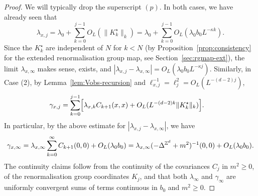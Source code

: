 \documentclass[11pt]{amsart}
\numberwithin{equation}{section}
\numberwithin{theorem}{section}
\newcommand{\1}{{\bf 1}}
\newcommand{\obs}{\star}
\newcommand{\Kobs}{K^\obs}
\newcommand{\ellxj}{\ell_{x,j}}
\newcommand{\OL}{O_L}
\begin{document}
\begin{proof}
  We will typically drop the superscript $(p)$.
  In both cases, we have already seen that
  \begin{equation}
    \lambda_{x,j}  = \lambda_0 + \sum_{k=0}^{j-1} \OL(\|\Kobs_k\|_k)  = \lambda_0 + \sum_{k=0}^{j-1} \OL(\lambda_0b_0L^{-\kappa k}) .
  \end{equation}
  Since the $\Kobs_k$ are independent of $N$ for $k<N$ (by
  Proposition~\ref{prop:consistency} for the extended
  renormalisation group map, see
    Section~\ref{sec:rgmap-ext}), the limit $\lambda_{x,\infty}$ makes sense, exists, and
    $|\lambda_{x,j}-\lambda_{x,\infty}| = \OL(\lambda_0b_0L^{-\kappa j})$.
  Similarly, in Case (2),
  by Lemma~\ref{lem:Vobs-recursion} and $\ellxj^{-1} = \ell_{j}^2 =\OL(L^{-(d-2)j})$,
  \begin{align}
    \gamma_{x,j}
    &= \sum_{k=0}^{j-1} \qB{ \lambda_{x,k} C_{k+1}(x,x) + \OL(L^{-(d-2)k}\|\Kobs_k\|_k)} .
  \end{align}
  In particular, by the above estimate for $|\lambda_{x,j}-\lambda_{x,\infty}|$,
  we have
    \begin{equation}
      \gamma_{x,\infty}
      = \lambda_{x,\infty}\sum_{k=0}^\infty C_{k+1}(0,0) + \OL(\lambda_0b_0)
      = \lambda_{x,\infty}(-\Delta^{\Z^d}+m^2)^{-1}(0,0) + \OL(\lambda_0b_0).
    \end{equation}
  The continuity claims follow from the continuity of the covariances
  $C_{j}$ in $m^{2}\geq 0$, of the renormalisation group coordinates
  $K_j$, and that both $\lambda_\infty$ and $\gamma_\infty$ are uniformly
  convergent sums of terms continuous in $b_{0}$ and $m^{2}\geq 0$. 
  

\end{proof}
\end{document}
